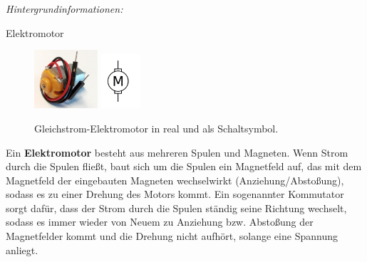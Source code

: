 \emph{Hintergrundinformationen:}
\medskip

\begin{zsfg}{Elektromotor}
	\begin{figure}
		\vspace{-0.7\baselineskip}
		\centering
		\hfill
		\includegraphics[width=0.21\textwidth]{./pics/dc-motor-klein.png}
		\hfill
		\includegraphics[width=0.13\textwidth]{./Zeichnungen/motor-schaltsym.png}
		\hfill
		\caption{Gleichstrom-Elektromotor in real und als Schaltsymbol.}
	\end{figure}
	Ein \textbf{Elektromotor} besteht aus mehreren Spulen und Magneten. Wenn Strom durch die Spulen fließt, baut sich um die Spulen ein Magnetfeld auf, das mit dem Magnetfeld der eingebauten Magneten wechselwirkt (Anziehung/Abstoßung), sodass es zu einer Drehung des Motors kommt. Ein sogenannter Kommutator sorgt dafür, dass der Strom durch die Spulen ständig seine Richtung wechselt, sodass es immer wieder von Neuem zu Anziehung bzw. Abstoßung der Magnetfelder kommt und die Drehung nicht aufhört, solange eine Spannung anliegt.
\end{zsfg}


